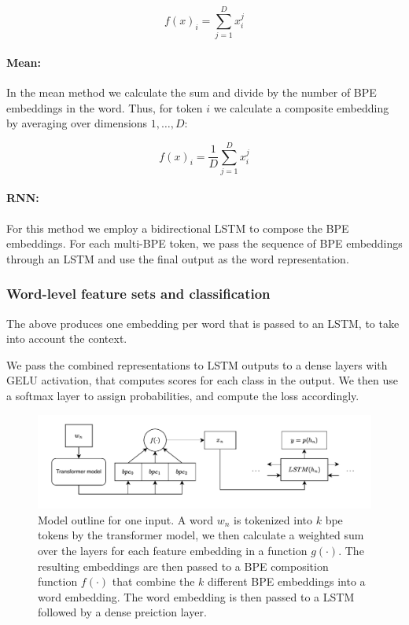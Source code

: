 \documentclass[11pt]{article}
\begin{document}
	\begin{equation}
	f(x)_i = \sum_{j=1}^{D} x_i^j
	\end{equation}
	

    	\paragraph{Mean:} In the mean method we calculate the sum and
     divide by the number of BPE embeddings in the word. Thus, for
     token $i$ we calculate a composite embedding by averaging over
     dimensions $1,\ldots,D$:
	
	\begin{equation}
	f(x)_{i} = \frac{1}{D}\sum_{j=1}^{D} x_i^j
	\end{equation}
	
	
	\paragraph{RNN:} For this method we employ a bidirectional LSTM
        to compose the BPE embeddings. For each multi-BPE
        token, we pass the sequence of BPE embeddings through an LSTM
        and use the final output as the word representation. 
        
        \subsubsection{Word-level feature sets and classification}
           The above produces one embedding per word that is passed to
        an LSTM, to take into account the context.

        We pass the combined representations to LSTM outputs to a
        dense layers with GELU activation, that computes scores
        for each class in the output. We then use a softmax layer to
        assign probabilities, and compute the loss accordingly.

	\begin{figure}%
	\centering
	\includegraphics[scale=0.5]{single_step.pdf}
    \caption{\label{fig:model} Model outline for one input. A
     word $w_n$ is tokenized into $k$ bpe tokens by the transformer
     model, we then calculate a weighted sum over the layers for each
     feature embedding in a function $g(\cdot)$. The resulting
     embeddings are then passed to a BPE composition function
     $f(\cdot)$ that combine the $k$ different BPE embeddings into a
     word embedding. The word embedding is then passed to a LSTM
     followed by a dense preiction layer. }
	\end{figure}
\end{document}
